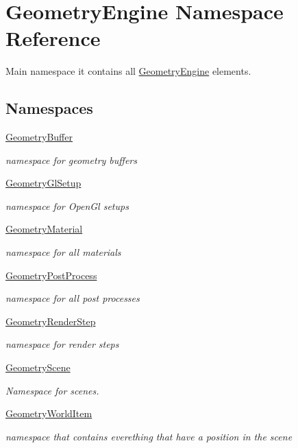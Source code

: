 \hypertarget{namespace_geometry_engine}{}\section{Geometry\+Engine Namespace Reference}
\label{namespace_geometry_engine}


Main namespace it contains all \mbox{\hyperlink{namespace_geometry_engine}{Geometry\+Engine}} elements.  


\subsection*{Namespaces}
\begin{DoxyCompactItemize}
\item 
 \mbox{\hyperlink{namespace_geometry_engine_1_1_geometry_buffer}{Geometry\+Buffer}}
\begin{DoxyCompactList}\small\item\em namespace for geometry buffers \end{DoxyCompactList}\item 
 \mbox{\hyperlink{namespace_geometry_engine_1_1_geometry_gl_setup}{Geometry\+Gl\+Setup}}
\begin{DoxyCompactList}\small\item\em namespace for Open\+Gl setups \end{DoxyCompactList}\item 
 \mbox{\hyperlink{namespace_geometry_engine_1_1_geometry_material}{Geometry\+Material}}
\begin{DoxyCompactList}\small\item\em namespace for all materials \end{DoxyCompactList}\item 
 \mbox{\hyperlink{namespace_geometry_engine_1_1_geometry_post_process}{Geometry\+Post\+Process}}
\begin{DoxyCompactList}\small\item\em namespace for all post processes \end{DoxyCompactList}\item 
 \mbox{\hyperlink{namespace_geometry_engine_1_1_geometry_render_step}{Geometry\+Render\+Step}}
\begin{DoxyCompactList}\small\item\em namespace for render steps \end{DoxyCompactList}\item 
 \mbox{\hyperlink{namespace_geometry_engine_1_1_geometry_scene}{Geometry\+Scene}}
\begin{DoxyCompactList}\small\item\em Namespace for scenes. \end{DoxyCompactList}\item 
 \mbox{\hyperlink{namespace_geometry_engine_1_1_geometry_world_item}{Geometry\+World\+Item}}
\begin{DoxyCompactList}\small\item\em namespace that contains everething that have a position in the scene \end{DoxyCompactList}\end{DoxyCompactItemize}

